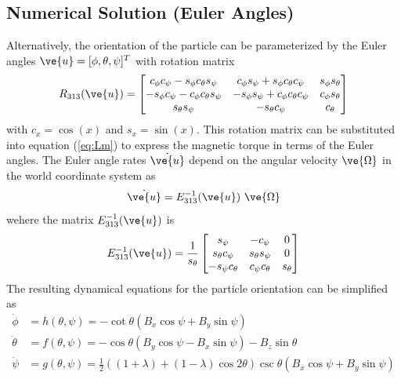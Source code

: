 \subsection*{Numerical Solution (Euler Angles)}

Alternatively, the orientation of the particle can be parameterized by the Euler angles $\ve{u}=[\phi,\theta,\psi]^T$ with rotation matrix\autocite{Diebel2006}
\begin{equation}
    R_{313}(\ve{u}) = \begin{bmatrix} 
     c_\phi c_\psi -  s_\phi c_\theta s_\psi  &  c_\phi s_\psi + s_\phi c_\theta c_\psi  &  s_\phi s_\theta \\
   -s_\phi c_\psi  - c_\phi c_\theta s_\psi &  -s_\phi s_\psi + c_\phi  c_\theta c_\psi &  c_\phi s_\theta  \\
    s_\theta s_\psi  & - s_\theta c_\psi  & c_\theta  \end{bmatrix}
\end{equation}
with $c_x =\cos(x)$ and $s_x=\sin(x)$. This rotation matrix can be substituted into equation (\ref{eq:Lm}) to express the magnetic torque in terms of the Euler angles. The Euler angle rates $\dot{\ve{u}}$ depend on the angular velocity $\ve{\Omega}$ in the world coordinate system as 
\begin{equation}
    \dot{\ve{u}} = E_{313}^{-1}(\ve{u})~ \ve{\Omega}
\end{equation}
wehere the matrix $ E_{313}^{-1}(\ve{u})$ is \begin{equation}
    E^{-1}_{313}(\ve{u}) = \frac{1}{s_{\theta}}\begin{bmatrix} 
     s_{\psi} & -c_{\psi} & 0
     \\
     s_{\theta} c_{\psi} & s_{\theta} s_{\psi} & 0
     \\
     -s_{\psi}c_{\theta} & c_{\psi}c_{\theta} & s_{\theta}
     \end{bmatrix}
\end{equation}
The resulting dynamical equations for the particle orientation can be simplified as
\begin{align}
    \dot{\phi} &= h(\theta,\psi) = -\cot \theta (B_x\cos\psi +B_y\sin\psi)
    \\
    \dot{\theta} &= f(\theta,\psi) = -\cos\theta (B_y \cos\psi - B_x \sin\psi) - B_z\sin\theta \label{eq:theta}
    \\
    \dot{\psi} &= g(\theta,\psi) = \tfrac{1}{2} \left((1+\lambda) +(1-\lambda)\cos2\theta \right) \csc\theta (B_x \cos \psi + B_y\sin\psi ) \label{eq:psi}
\end{align}
